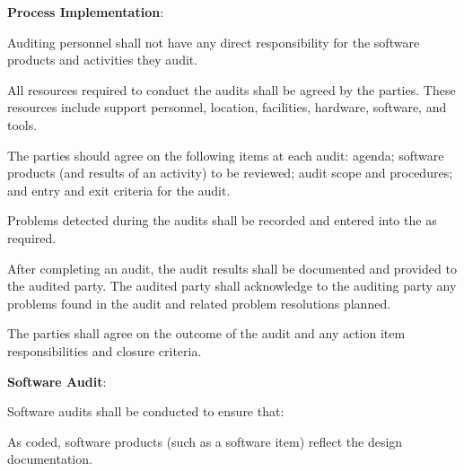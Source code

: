 			\begin{adjustwidth}{2em}{0pt} 

				\begin{compactenum}

					\item {\bf Process Implementation}:

					\begin{compactenum}

						\item Auditing personnel shall not have any direct responsibility for the software products and activities they audit.

						\item All resources required to conduct the audits shall be agreed by the parties. These resources include support personnel, location, facilities, hardware, software, and tools.

						\item The parties should agree on the following items at each audit: agenda; software products (and results of an activity) to be reviewed; audit scope and procedures; and entry and exit criteria for the audit.

						\item Problems detected during the audits shall be recorded and entered into the  as required.

						\item After completing an audit, the audit results shall be documented and provided to the audited party. The audited party shall acknowledge to the auditing party any problems found in the audit and related problem resolutions planned.

						\item The parties shall agree on the outcome of the audit and any action item responsibilities and closure criteria.

					\end{compactenum}

					\item {\bf Software Audit}:

					\begin{compactenum}

						\item Software audits shall be conducted to ensure that:

						\begin{compactenum}

							\item As coded, software products (such as a software item) reflect the design documentation.


\end{compactenum}
\end{compactenum}
\end{compactenum}
\end{adjustwidth}
